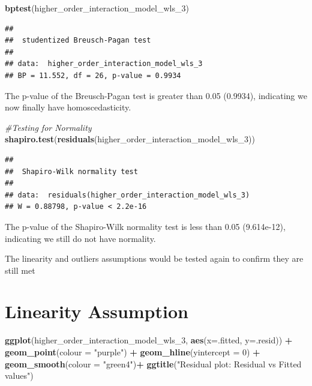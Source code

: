 \documentclass[
]{article}
\newenvironment{Shaded}{\begin{snugshade}}{\end{snugshade}}
\newcommand{\AttributeTok}[1]{\textcolor[rgb]{0.13,0.29,0.53}{#1}}
\newcommand{\CommentTok}[1]{\textcolor[rgb]{0.56,0.35,0.01}{\textit{#1}}}
\newcommand{\DecValTok}[1]{\textcolor[rgb]{0.00,0.00,0.81}{#1}}
\newcommand{\FunctionTok}[1]{\textcolor[rgb]{0.13,0.29,0.53}{\textbf{#1}}}
\newcommand{\NormalTok}[1]{#1}
\newcommand{\SpecialCharTok}[1]{\textcolor[rgb]{0.81,0.36,0.00}{\textbf{#1}}}
\newcommand{\StringTok}[1]{\textcolor[rgb]{0.31,0.60,0.02}{#1}}
\begin{document}
\begin{Shaded}
\begin{Highlighting}[]
\FunctionTok{bptest}\NormalTok{(higher\_order\_interaction\_model\_wls\_3)}
\end{Highlighting}
\end{Shaded}

\begin{verbatim}
## 
##  studentized Breusch-Pagan test
## 
## data:  higher_order_interaction_model_wls_3
## BP = 11.552, df = 26, p-value = 0.9934
\end{verbatim}

The p-value of the Breusch-Pagan test is greater than 0.05 (0.9934),
indicating we now finally have homoscedasticity.

\begin{Shaded}
\begin{Highlighting}[]
\CommentTok{\#Testing for Normality}
\FunctionTok{shapiro.test}\NormalTok{(}\FunctionTok{residuals}\NormalTok{(higher\_order\_interaction\_model\_wls\_3))}
\end{Highlighting}
\end{Shaded}

\begin{verbatim}
## 
##  Shapiro-Wilk normality test
## 
## data:  residuals(higher_order_interaction_model_wls_3)
## W = 0.88798, p-value < 2.2e-16
\end{verbatim}

The p-value of the Shapiro-Wilk normality test is less than 0.05
(9.614e-12), indicating we still do not have normality.

The linearity and outliers assumptions would be tested again to confirm
they are still met

\section{Linearity Assumption}\label{linearity-assumption-1}

\begin{Shaded}
\begin{Highlighting}[]
\FunctionTok{ggplot}\NormalTok{(higher\_order\_interaction\_model\_wls\_3, }\FunctionTok{aes}\NormalTok{(}\AttributeTok{x=}\NormalTok{.fitted, }\AttributeTok{y=}\NormalTok{.resid)) }\SpecialCharTok{+}
\FunctionTok{geom\_point}\NormalTok{(}\AttributeTok{colour =} \StringTok{"purple"}\NormalTok{) }\SpecialCharTok{+}
\FunctionTok{geom\_hline}\NormalTok{(}\AttributeTok{yintercept =} \DecValTok{0}\NormalTok{) }\SpecialCharTok{+}
\FunctionTok{geom\_smooth}\NormalTok{(}\AttributeTok{colour =} \StringTok{"green4"}\NormalTok{)}\SpecialCharTok{+}
\FunctionTok{ggtitle}\NormalTok{(}\StringTok{"Residual plot: Residual vs Fitted values"}\NormalTok{)}
\end{Highlighting}
\end{Shaded}
\end{document}
